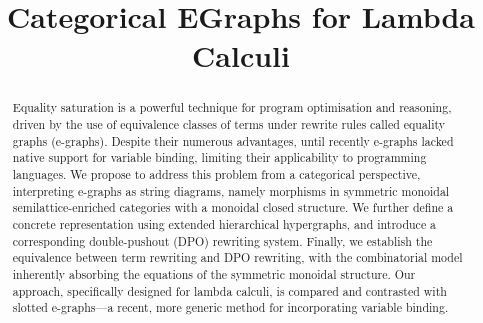 \documentclass[acmsmall,screen, nonacm, review, anonymous]{acmart}
\title{Categorical EGraphs for Lambda Calculi}
\begin{document}
\begin{abstract}
	Equality saturation is a powerful technique for program optimisation and reasoning, driven by the use of equivalence classes of terms under rewrite rules called equality graphs (e-graphs).
	Despite their numerous advantages, until recently e-graphs lacked native support for variable binding, limiting their applicability to programming languages.
	We propose to address this problem from a categorical perspective, interpreting e-graphs as string diagrams, namely morphisms in symmetric monoidal semilattice-enriched categories with a monoidal closed structure.
	We further define a concrete representation using extended hierarchical hypergraphs, and introduce a corresponding double-pushout (DPO) rewriting system.
	Finally, we establish the equivalence between term rewriting and DPO rewriting, with the combinatorial model inherently absorbing the equations of the symmetric monoidal structure.
	Our approach, specifically designed for lambda calculi, is compared and contrasted with slotted e-graphs—a recent, more generic method for incorporating variable binding.
\end{abstract}

\maketitle






\end{document}

